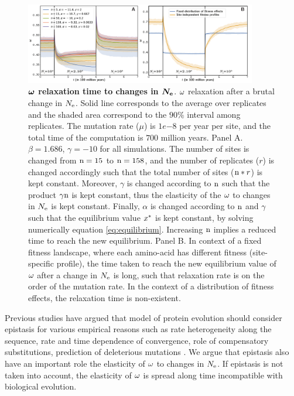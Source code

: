 \documentclass{article}
\begin{document}
\begin{figure}[htb!]
\begin{mdframed}
 \centering
 \includegraphics[width=0.9\textwidth] {artworks/Relaxation.pdf}
 \caption{
  \textbf{$\bm{\omega}$ relaxation time to changes in $\bm{N_{\mathrm{e}}}$}.
  $\omega$ relaxation after a brutal change in $N_{\mathrm{e}}$.
  Solid line corresponds to the average over replicates and the shaded area correspond to the $90\%$ interval among replicates. 
  The mutation rate ($\mu$) is $1e{-8}$ per year per site, and the total time of the computation is $700$ million years.
  Panel A. $\beta=1.686$, $\gamma=-10$ for all simulations. The number of sites is changed from $\text{n}=15$ to $\text{n}=158$, and the number of replicates ($r$) is changed accordingly such that the total number of sites ($\text{n}*r$) is kept constant.
  Moreover, $\gamma$ is changed according to $\text{n}$ such that the product $\gamma\text{n}$ is kept constant, thus the elasticity of the $\omega$ to changes in $N_{\mathrm{e}}$ is kept constant.
  Finally, $\alpha$ is changed according to $\text{n}$ and $\gamma$ such that the equilibrium value $x^{*}$ is kept constant, by solving numerically equation \ref{eq:equilibrium}.
  Increasing $\text{n}$ implies a reduced time to reach the new equilibrium.
  Panel B. In context of a fixed fitness landscape, where each amino-acid has different fitness (site-specific profile), the time taken to reach the new equilibrium value of $\omega$ after a change in $N_{\mathrm{e}}$ is long, such that relaxation rate is on the order of the mutation rate. In the context of a distribution of fitness effects, the relaxation time is non-existent.
 }
 \label{fig:relaxStability}
\end{mdframed}
\end{figure}

Previous studies have argued that model of protein evolution should consider epistasis for various empirical reasons such as rate heterogeneity along the sequence, rate and time dependence of convergence, role of compensatory substitutions, prediction of deleterious mutations \cite{Goldstein2017}.
We argue that epistasis also have an important role the elasticity of $\omega$ to changes in $N_{\mathrm{e}}$.
If epistasis is not taken into account, the elasticity of $\omega$ is spread along time incompatible with biological evolution. \\
\end{document}

